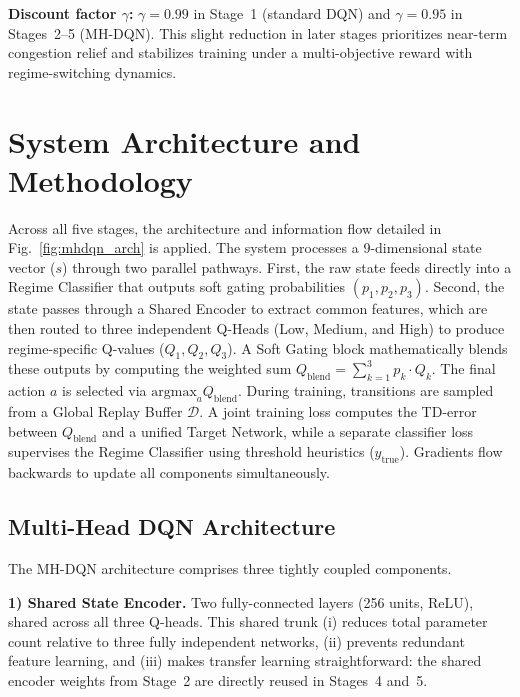 \documentclass[lettersize,journal]{IEEEtran}
\begin{document}
\textbf{Discount factor $\gamma$:} $\gamma=0.99$ in Stage~1 (standard DQN)
and $\gamma=0.95$ in Stages~2--5 (MH-DQN). This slight reduction in later
stages prioritizes near-term congestion relief and stabilizes training under
a multi-objective reward with regime-switching dynamics.

\section{System Architecture and Methodology}
\label{sec:methodology}

Across all five stages, the architecture and information flow detailed in Fig.~\ref{fig:mhdqn_arch} is applied. The system processes a 9-dimensional state vector ($s$) through two parallel pathways. First, the raw state feeds directly into a Regime Classifier that outputs soft gating probabilities $(p_1, p_2, p_3)$. Second, the state passes through a Shared Encoder to extract common features, which are then routed to three independent Q-Heads (Low, Medium, and High) to produce regime-specific Q-values ($Q_1, Q_2, Q_3$). A Soft Gating block mathematically blends these outputs by computing the weighted sum $Q_{\text{blend}} = \sum_{k=1}^3 p_k \cdot Q_k$. The final action $a$ is selected via $\text{argmax}_a Q_{\text{blend}}$. During training, transitions are sampled from a Global Replay Buffer $\mathcal{D}$. A joint training loss computes the TD-error between $Q_{\text{blend}}$ and a unified Target Network, while a separate classifier loss supervises the Regime Classifier using threshold heuristics ($y_{\text{true}}$). Gradients flow backwards to update all components simultaneously.

\subsection{Multi-Head DQN Architecture}

The MH-DQN architecture comprises three tightly coupled components.

\textbf{1) Shared State Encoder.}
Two fully-connected layers (256 units, ReLU), shared across all three Q-heads.
This shared trunk (i) reduces total parameter count
relative to three fully independent networks, (ii) prevents redundant
feature learning, and (iii) makes transfer learning straightforward: the
shared encoder weights from Stage~2 are directly reused in Stages~4 and~5.
\end{document}
